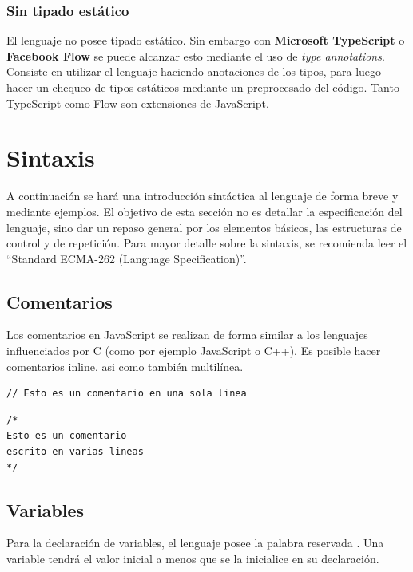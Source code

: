 \subsubsection{Sin tipado estático}

El lenguaje no posee tipado estático. Sin embargo con \textbf{Microsoft TypeScript} o \textbf{Facebook Flow} se puede alcanzar esto mediante el uso de \textit{type annotations}. Consiste en utilizar el lenguaje haciendo anotaciones de los tipos, para luego hacer un chequeo de tipos estáticos mediante un preprocesado del código. Tanto TypeScript como Flow son extensiones de JavaScript. 

\section{Sintaxis}

A continuación se hará una introducción sintáctica al lenguaje de forma breve y mediante ejemplos. El objetivo de esta sección no es detallar la especificación del lenguaje, sino dar un repaso general por los elementos básicos, las estructuras de control y de repetición. Para mayor detalle sobre la sintaxis, se recomienda leer el "`Standard ECMA-262 (Language Specification)"'.

\subsection{Comentarios}

Los comentarios en JavaScript se realizan de forma similar a los lenguajes influenciados por C (como por ejemplo JavaScript o C++). Es posible hacer comentarios inline, asi como también multilínea.

\begin{lstlisting}[title={Comentario inline}]
// Esto es un comentario en una sola linea
\end{lstlisting}

\begin{lstlisting}[title={Comentario multilinea}]
/* 
Esto es un comentario
escrito en varias lineas
*/
\end{lstlisting}

\subsection{Variables}

Para la declaración de variables, el lenguaje posee la palabra reservada . Una variable tendrá el valor inicial  a menos que se la inicialice en su declaración.

